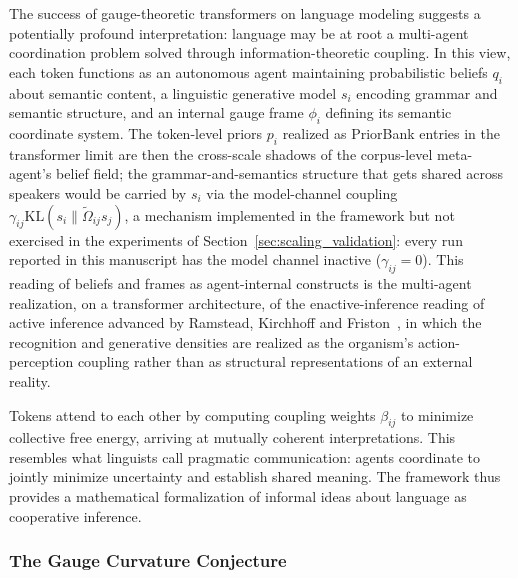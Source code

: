 \documentclass[11pt]{article}
\begin{document}
The success of gauge-theoretic transformers on language modeling suggests a potentially profound interpretation: language may be at root a multi-agent coordination problem solved through information-theoretic coupling. In this view, each token functions as an autonomous agent maintaining probabilistic beliefs $q_i$ about semantic content, a linguistic generative model $s_i$ encoding grammar and semantic structure, and an internal gauge frame $\phi_i$ defining its semantic coordinate system. The token-level priors $p_i$ realized as PriorBank entries in the transformer limit are then the cross-scale shadows of the corpus-level meta-agent's belief field; the grammar-and-semantics structure that gets shared across speakers would be carried by $s_i$ via the model-channel coupling $\gamma_{ij}\mathrm{KL}(s_i\|\tilde\Omega_{ij}s_j)$, a mechanism implemented in the framework but not exercised in the experiments of Section~\ref{sec:scaling_validation}: every run reported in this manuscript has the model channel inactive ($\gamma_{ij} = 0$). This reading of beliefs and frames as agent-internal constructs is the multi-agent realization, on a transformer architecture, of the enactive-inference reading of active inference advanced by Ramstead, Kirchhoff and Friston~\cite{Ramstead2019}, in which the recognition and generative densities are realized as the organism's action-perception coupling rather than as structural representations of an external reality.

Tokens attend to each other by computing coupling weights $\beta_{ij}$ to minimize collective free energy, arriving at mutually coherent interpretations. This resembles what linguists call pragmatic communication: agents coordinate to jointly minimize uncertainty and establish shared meaning. The framework thus provides a mathematical formalization of informal ideas about language as cooperative inference.

\subsubsection{The Gauge Curvature Conjecture}
\label{sec:gauge_curvature_conjecture}
\end{document}
